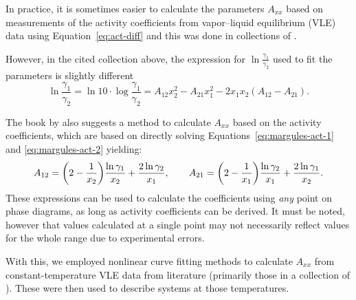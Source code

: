 In practice, it is sometimes easier to calculate the parameters $A_{xx}$ based on
measurements of the activity coefficients from vapor--liquid equilibrium (VLE) data 
using Equation~\ref{eq:act-diff} and this was done in collections of .

However, in the cited collection above, the expression for 
$\ln\frac{\gamma_1}{\gamma_2}$ used to fit the parameters is slightly different
\[
    \ln\dfrac{\gamma_1}{\gamma_2} = \ln 10 \cdot
    \log \dfrac{\gamma_1}{\gamma_2} = A_{12}x_2^2 - A_{21}x_1^2 - 2x_1x_2
    (A_{12} - A_{21}).
\]

The book by  also suggests a method to calculate $A_{xx}$
based on the activity coefficients, which are based on directly solving
Equations~\ref{eq:margules-act-1} and \ref{eq:margules-act-2} yielding:
\[
    A_{12} = \qty(2 - \frac1{x_2}) \dfrac{\ln\gamma_1}{x_2} + 
    \dfrac{2\ln\gamma_2}{x_1},\qquad
    A_{21} = \qty(2 - \frac1{x_1}) \dfrac{\ln\gamma_2}{x_1} + 
    \dfrac{2\ln\gamma_1}{x_2}.
\]
These expressions can be used to calculate the coefficients using \textit{any} point
on phase diagrams, as long as activity coefficients can be derived. It must be noted,
however that values calculated at a single point may not necessarily 
reflect values for the whole range due to experimental errors.

With this, we employed nonlinear curve fitting methods to calculate $A_{xx}$ from 
constant-temperature VLE data from literature (primarily those in a collection of 
). These were then used to describe systems at those temperatures.
